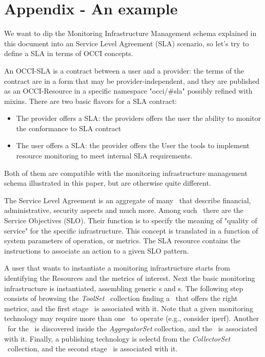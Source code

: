 \documentclass[12pt]{article}  %
\begin{document}
{%

\appendix

\section*{Appendix - An example}

We want to dip the Monitoring Infrastructure Management schema explained in this document into an Service Level Agreement (SLA) scenario, so let's try to define a SLA in terms of OCCI concepts.

An OCCI-SLA is a contract between a user and a provider: the terms of the contract are in a form that may be provider-independent, and they are published as an OCCI-Resource in a specific namespace "occi/\#sla" possibly refined with mixins. There are two basic flavors for a SLA contract:

\begin{itemize} 
\item The provider offers a SLA: the providers offers the user the ability to monitor the conformance to SLA contract
\item The user offers a SLA: the provider offers the User the tools to implement resource monitoring to meet internal SLA requirements.
\end{itemize}

Both of them are compatible with the monitoring infrastructure management schema illustrated in this paper, but are otherwise quite different.

The Service Level Agreement is an aggregate of many \rs\, that describe financial, administrative, security aspects and much more. Among such \rs\, there are the Service  Objectives (SLO). Their function is to specify the meaning of "quality of service" for the specific infrastructure. This concept is translated in a function of system parameters of operation, or metrics.
 The SLA resource contains the instructions to associate an action to a given SLO pattern.

A user that wants to instantiate a monitoring infrastructure starts from identifying the Resources and the metrics of interest. Next the basic monitoring infrastructure is instantiated, assembling generic \sens s and \coll s. The following step consists of browsing the {\em ToolSet} \mi\ collection finding a \mi\ that offers the right metrics, and the first stage \coll\ is associated with it. Note that a given monitoring technology may require more than one \coll\ to operate (e.g., consider iperf). Another \mi\ for the \sens\ is discovered inside the {\em AggregatorSet} collection, and the \sens\ is associated with it. Finally, a publishing technology is selectd from the {\em CollectorSet} \mi\ collection, and the second stage \coll\ is associated with it.

}
\end{document}
